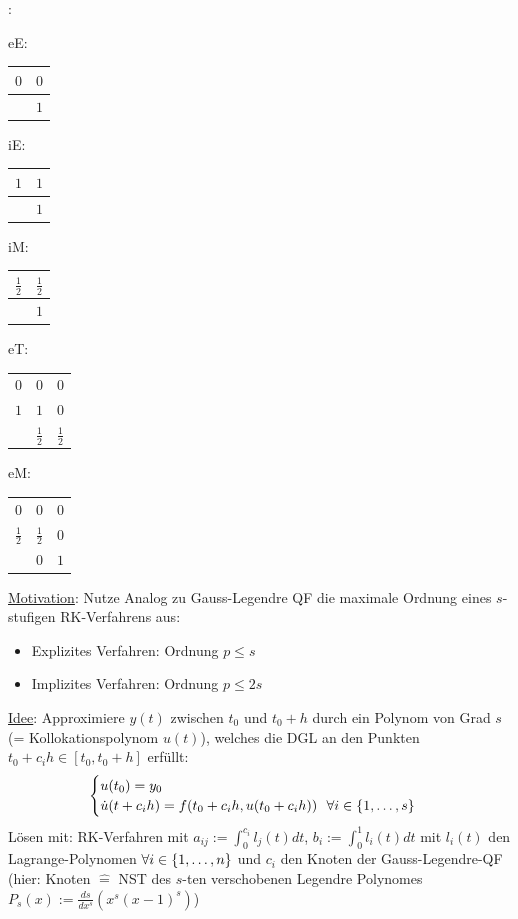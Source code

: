 \vspace{1\baselineskip}

:

\vspace{1\baselineskip}

eE:
\begin{tabular}{c|c}
    $0$ & $0$ \\
    \hline & $1$
\end{tabular}
\quad
iE: \begin{tabular}{c|c}
    $1$ & $1$ \\
    \hline & $1$
\end{tabular}
\quad
iM: \begin{tabular}{c|c}
    $\frac{1}{2}$ & $\frac{1}{2}$ \\
    \hline & $1$
\end{tabular}

\vspace{1\baselineskip}

eT: \begin{tabular}{c|cc}
    $0$ & $0$ & $0$ \\
    $1$ & $1$ & $0$ \\
    \hline & $\frac{1}{2}$ & $\frac{1}{2}$ 
\end{tabular}
\quad
eM: \begin{tabular}{c|cc}
    $0$ & $0$ & $0$ \\
    $\frac{1}{2}$ & $\frac{1}{2}$ & 0 \\
    \hline & $0$ & $1$
\end{tabular}

\pagebreak

\underline{}

\underline{Motivation}: Nutze Analog zu Gauss-Legendre QF die maximale Ordnung eines
$s$-stufigen RK-Verfahrens aus:
\begin{itemize}
    \item Explizites Verfahren: Ordnung $p \leq s$
    \item Implizites Verfahren: Ordnung $p \leq 2s$
\end{itemize}
\underline{Idee}: Approximiere $y(t)$ zwischen $t_0$ und $t_0 + h$ durch ein
Polynom von Grad $s$ (= Kollokationspolynom $u(t)$), welches die DGL an den Punkten
$t_0 + c_i h \in [t_0 , t_0 + h]$ erfüllt:
\begin{align*}
    \begin{cases}
        u(t_0) = y_0 \\
        \dot{u}(t + c_i h) = f(t_0 + c_i h , u(t_0+c_i h)) \ \
        \forall i \in \left\{ 1,\dots,s \right\}
    \end{cases}
\end{align*}
Lösen mit: RK-Verfahren mit $a_{ij} := \int_0^{c_i} l_j (t) dt$,
$b_i := \int_0^1 l_i (t) dt$ mit $l_i(t)$ den Lagrange-Polynomen $\forall i \in
\left\{ 1,\dots,n \right\}$ und $c_i$ den Knoten der Gauss-Legendre-QF
(hier: Knoten $\hat{=}$ NST des $s$-ten verschobenen Legendre Polynomes
$P_s (x) := \frac{ds}{dx^s} (x^s (x-1)^s)$)

